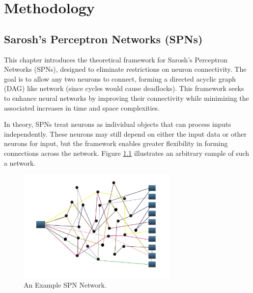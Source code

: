 
\chapter{Methodology} %

\label{Methodology} %


\section{Sarosh's Perceptron Networks (SPNs)}

This chapter introduces the theoretical framework for Sarosh's Perceptron Networks (SPNs), designed to eliminate restrictions on neuron connectivity. The goal is to allow any two neurons to connect, forming a directed acyclic graph (DAG) like network (since cycles would cause deadlocks). This framework seeks to enhance neural networks by improving their connectivity while minimizing the associated increases in time and space complexities.
 
In theory, SPNs treat neurons as individual objects that can process inputs independently. These neurons may still depend on either the input data or other neurons for input, but the framework enables greater flexibility in forming connections across the network. Figure \ref{fig:exampleSPN} illustrates an arbitrary eample of such a network.

\begin{figure}[h!]
\centering
\includegraphics[width=0.7\textwidth]{Figures/Methodology/example_spn.jpg}
\caption{An Example SPN Network.}
\label{fig:exampleSPN}
\end{figure}

